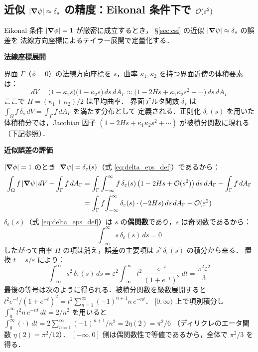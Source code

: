 \subsection{\texorpdfstring{近似 $|\bm{\nabla}\psi| \approx \delta_s$ の精度：Eikonal 条件下で $\mathcal{O}(\varepsilon^2)$}{近似 |∇ψ|≈δ\_s の精度：Eikonal 条件下で O(ε²)}}
\label{app:csf_delta_precision}

Eikonal 条件 $|\bm{\nabla}\phi|=1$ が厳密に成立するとき，
§\ref{sec:csf} の近似 $|\bm{\nabla}\psi| \approx \delta_s$ の誤差を
法線方向座標によるテイラー展開で定量化する．

\medskip
\noindent\textbf{法線座標展開}

界面 $\Gamma$（$\phi=0$）の法線方向座標を $s$，曲率 $\kappa_1, \kappa_2$ を持つ界面近傍の体積要素は：
\[
  dV = \bigl(1 - \kappa_1 s\bigr)\bigl(1 - \kappa_2 s\bigr)\, ds\, dA_\Gamma
  \approx \bigl(1 - 2H s + \kappa_1\kappa_2 s^2 + \cdots\bigr)\, ds\, dA_\Gamma
\]
ここで $H = (\kappa_1+\kappa_2)/2$ は平均曲率．
界面デルタ関数 $\delta_s$ は $\int_\Omega f\,\delta_s\,dV = \int_\Gamma f\,dA_\Gamma$ を満たす分布として
定義される．正則化 $\delta_\varepsilon(s)$ を用いた体積積分では，Jacobian 因子
$(1 - 2Hs + \kappa_1\kappa_2 s^2 + \cdots)$ が被積分関数に現れる（下記参照）．

\noindent\textbf{近似誤差の評価}

$|\bm{\nabla}\phi|=1$ のとき $|\bm{\nabla}\psi| = \delta_\varepsilon(s)$（式 \eqref{eq:delta_eps_def}）であるから：
\begin{align*}
  \int_\Omega f\,|\bm{\nabla}\psi|\,dV - \int_\Gamma f\,dA_\Gamma
  &= \int_\Gamma \int_{-\infty}^{\infty}
       f\,\delta_\varepsilon(s)\,\bigl(1 - 2Hs + \mathcal{O}(s^2)\bigr)\,ds\, dA_\Gamma
     - \int_\Gamma f\, dA_\Gamma \\
  &= \int_\Gamma f\!\int_{-\infty}^{\infty}\delta_\varepsilon(s)\cdot(-2Hs)\,ds\, dA_\Gamma
     + \mathcal{O}(\varepsilon^2)
\end{align*}
$\delta_\varepsilon(s)$（式 \eqref{eq:delta_eps_def}）は $s$ の\textbf{偶関数}であり，$s$ は奇関数であるから：
\[
  \int_{-\infty}^{\infty} s\,\delta_\varepsilon(s)\,ds = 0
\]
したがって曲率 $H$ の項は消え，誤差の主要項は $s^2\,\delta_\varepsilon(s)$ の積分から来る．
置換 $t = s/\varepsilon$ により：
\[
  \int_{-\infty}^{\infty} s^2\,\delta_\varepsilon(s)\,ds
  = \varepsilon^2 \int_{-\infty}^{\infty} t^2\,\frac{e^{-t}}{(1+e^{-t})^2}\,dt
  = \frac{\pi^2\varepsilon^2}{3}
\]
最後の等号は次のように得られる．被積分関数を級数展開すると
$t^2 e^{-t}/(1+e^{-t})^2 = t^2 \sum_{n=1}^{\infty}(-1)^{n+1} n\,e^{-nt}$．
$[0,\infty)$ 上で項別積分し $\int_0^\infty t^2 n\,e^{-nt}\,dt = 2/n^2$ を用いると
$\int_0^\infty (\cdot)\,dt = 2\sum_{n=1}^{\infty}(-1)^{n+1}/n^2 = 2\eta(2) = \pi^2/6$
（ディリクレのエータ関数 $\eta(2) = \pi^2/12$）．
$[-\infty,0]$ 側は偶関数性で等値であるから，全体で $\pi^2/3$ を得る．

